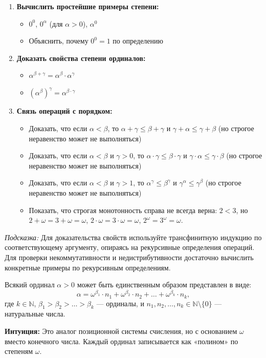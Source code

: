 \documentclass[11pt, a4paper]{extarticle}
\newcommand{\al}{\alpha}
\newcommand{\be}{\beta}
\newcommand{\ga}{\gamma}
\newcommand{\om}{\omega}
\newcommand{\N}{{\mathbb N}}
\renewcommand{\le}{\leqslant}
\begin{document}
\begin{exercise}
\begin{enumerate}
    \item \textbf{Вычислить простейшие примеры степени:}
    \begin{itemize}
        \item $0^0$, $0^\al$ (для $\al > 0$), $\al^0$
        \item Объяснить, почему $0^0 = 1$ по определению
    \end{itemize}
    
    \item \textbf{Доказать свойства степени ординалов:}
    \begin{itemize}
        \item $\al^{\be + \ga} = \al^{\be} \cdot \al^{\ga}$
        \item $(\al^{\be})^{\ga} = \al^{\be \cdot \ga}$
    \end{itemize}
    
    \item \textbf{Связь операций с порядком:}
    \begin{itemize}
        \item Доказать, что если $\al < \be$, то $\al + \ga \le \be + \ga$ и $\ga + \al \le \ga + \be$ (но строгое неравенство может не выполняться)
        \item Доказать, что если $\al < \be$ и $\ga > 0$, то $\al \cdot \ga \le \be \cdot \ga$ и $\ga \cdot \al \le \ga \cdot \be$ (но строгое неравенство может не выполняться)
        \item Доказать, что если $\al < \be$ и $\ga > 1$, то $\al^{\ga} \le \be^{\ga}$ и $\ga^{\al} \le \ga^{\be}$ (но строгое неравенство может не выполняться)
        \item Показать, что строгая монотонность справа не всегда верна: $2 < 3$, но $2 + \omega = 3 + \omega = \omega$, $2 \cdot \omega = 3 \cdot \omega = \omega$, $2^{\omega} = 3^{\omega}=\omega$.
    \end{itemize}
\end{enumerate}

\textit{Подсказка:} Для доказательства свойств используйте трансфинитную индукцию по соответствующему аргументу, опираясь на рекурсивные определения операций. Для проверки некоммутативности и недистрибутивности достаточно вычислить конкретные примеры по рекурсивным определениям.
\end{exercise}

\begin{theorem}
    Всякий ординал $\al > 0$ может быть единственным образом представлен в виде:
    $$\al = \om^{\be_1} \cdot n_1 + \om^{\be_2} \cdot n_2 + \dots + \om^{\be_k} \cdot n_k,$$
    где $k \in \N$, $\be_1 > \be_2 > \dots > \be_k$ --- ординалы, и $n_1, n_2, \dots, n_k \in \N \setminus \{0\}$ --- натуральные числа.
    
    \textbf{Интуиция:} Это аналог позиционной системы счисления, но с основанием $\om$ вместо конечного числа. Каждый ординал записывается как «полином» по степеням $\om$.
    \end{theorem}
    
\end{document}
